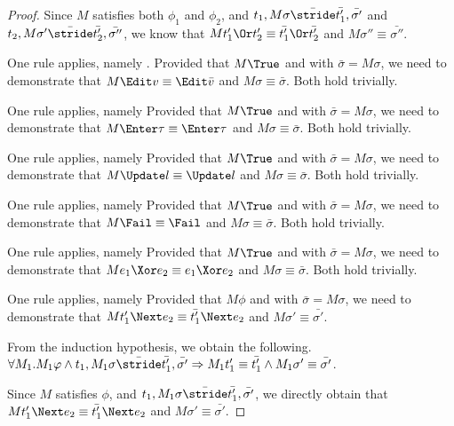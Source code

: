 \begin{proof}
{{    Since $M$ satisfies both $\phi_1$ and $\phi_2$, and $t_1,M\sigma \bar{\stride} \bar{t_1'},\bar{\sigma'}$ and $t_2,M\sigma'\bar{\stride}\bar{t_2'},\bar{\sigma''}$,
    we know that $M t_1'\Or t_2'\equiv \bar{t_1'}\Or\bar{t_2'}$ and $M\sigma''\equiv \bar{\sigma''}$.

    }
  }

  {One rule applies, namely .
  Provided that $M\True$ and  with $\bar{\sigma}=M\sigma$,
  we need to demonstrate that $M\Edit v \equiv \Edit \bar{v}$ and $M\sigma \equiv \bar{\sigma}$.
  Both hold trivially.

  }

  {One rule applies, namely 
  Provided that $M\True$ and  with $\bar{\sigma}=M\sigma$,
  we need to demonstrate that $M\Enter \tau \equiv \Enter \tau$ and $M\sigma \equiv \bar{\sigma}$.
  Both hold trivially.
  }

  {One rule applies, namely 
  Provided that $M\True$ and  with $\bar{\sigma}=M\sigma$,
  we need to demonstrate that $M\Update l \equiv \Update l$ and $M\sigma \equiv \bar{\sigma}$.
  Both hold trivially.
  }

  {One rule applies, namely 
  Provided that $M\True$ and  with $\bar{\sigma}=M\sigma$,
  we need to demonstrate that $M\Fail \equiv \Fail$ and $M\sigma \equiv \bar{\sigma}$.
  Both hold trivially.
  }

  {One rule applies, namely 
  Provided that $M\True$ and  with $\bar{\sigma}=M\sigma$,
  we need to demonstrate that $M e_1\Xor e_2 \equiv e_1\Xor e_2$ and $M\sigma \equiv \bar{\sigma}$.
  Both hold trivially.
  }

  {One rule applies, namely 
  Provided that $M\phi$ and  with $\bar{\sigma}=M\sigma$,
  we need to demonstrate that $M t_1'\Next e_2\equiv \bar{t_1'}\Next e_2$ and $M \sigma'\equiv\bar{\sigma'}$.

  From the induction hypothesis, we obtain the following.
  $\forall M_1 . M_1 \phi \land t_1,M_1\sigma \bar{\stride} \bar{t_1'},\bar{\sigma'}\implies M_1 t_1'\equiv\bar{t_1'}\land M_1\sigma' \equiv \bar{\sigma'}$.

  Since $M$ satisfies $\phi$, and $t_1,M_1\sigma \bar{\stride} \bar{t_1'},\bar{\sigma'}$,
  we directly obtain that $M t_1'\Next e_2\equiv \bar{t_1'}\Next e_2$ and $M \sigma'\equiv\bar{\sigma'}$.

}
\end{proof}
